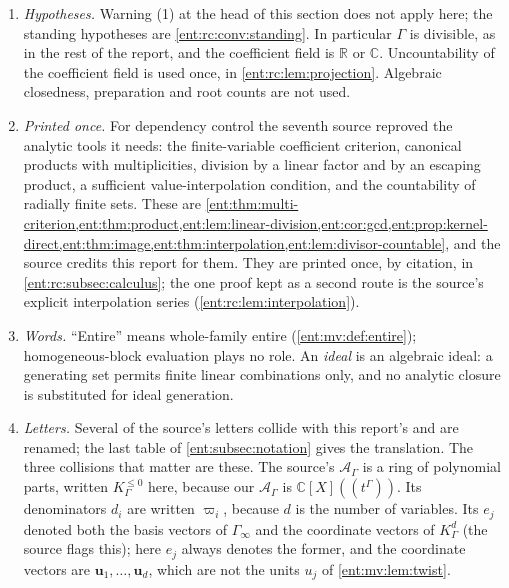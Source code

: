\documentclass[11pt]{article}
\theoremstyle{plain}
\theoremstyle{plain}
\theoremstyle{plain}
\theoremstyle{definition}
\theoremstyle{definition}
\theoremstyle{definition}
\theoremstyle{definition}
\theoremstyle{remark}
\newcommand{\C}{\mathbb C}\newcommand{\R}{\mathbb R}
\newcommand{\K}{K_\Gamma}\newcommand{\KD}{K_\Delta}
\newcommand{\A}{\mathcal A_\Gamma}\newcommand{\OO}{\mathcal O_\Gamma}
\newcommand{\Kle}{K_\Gamma^{\le0}}\DeclareMathOperator{\Jac}{Jac}
\begin{document}
\begin{enumerate}[label=(\arabic*),leftmargin=2em]
\item \emph{Hypotheses.} Warning (1) at the head of this section does not
apply here; the standing hypotheses are \cref{ent:rc:conv:standing}. In
particular $\Gamma$ is divisible, as in the rest of the report, and the
coefficient field is $\R$ or $\C$. Uncountability of the coefficient field is
used once, in \cref{ent:rc:lem:projection}. Algebraic closedness,
preparation and root counts are not used.
\item \emph{Printed once.} For dependency control the seventh source reproved
the analytic tools it needs: the finite-variable coefficient criterion,
canonical products with multiplicities, division by a linear factor and by an
escaping product, a sufficient value-interpolation condition, and the
countability of radially finite sets. These are
\cref{ent:thm:multi-criterion,ent:thm:product,ent:lem:linear-division,ent:cor:gcd,ent:prop:kernel-direct,ent:thm:image,ent:thm:interpolation,ent:lem:divisor-countable},
and the source credits this report for them. They are printed once, by
citation, in \cref{ent:rc:subsec:calculus}; the one proof kept as a second
route is the source's explicit interpolation series
(\cref{ent:rc:lem:interpolation}).
\item \emph{Words.} ``Entire'' means whole-family entire
(\cref{ent:mv:def:entire}); homogeneous-block evaluation plays no role. An
\emph{ideal} is an algebraic ideal: a generating set permits finite linear
combinations only, and no analytic closure is substituted for ideal
generation.
\item \emph{Letters.} Several of the source's letters collide with this
report's and are renamed; the last table of \cref{ent:subsec:notation} gives
the translation. The three collisions that matter are these. The source's
$\mathcal A_\Gamma$ is a ring of polynomial parts, written $\Kle$ here,
because our $\A$ is $\C[X]((t^\Gamma))$. Its denominators $d_i$ are written
$\varpi_i$, because $d$ is the number of variables. Its $e_j$ denoted both the
basis vectors of $\Gamma_\infty$ and the coordinate vectors of $\K^d$ (the
source flags this); here $e_j$ always denotes the former, and the coordinate
vectors are $\mathbf u_1,\ldots,\mathbf u_d$, which are not the units $u_j$
of \cref{ent:mv:lem:twist}.
\end{enumerate}
\end{document}
